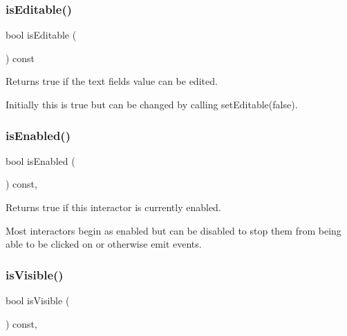 \subsubsection{\texorpdfstring{is\+Editable()}{isEditable()}}
{\footnotesize\ttfamily bool is\+Editable (\begin{DoxyParamCaption}{ }\end{DoxyParamCaption}) const\hspace{0.3cm}{\ttfamily [virtual]}}



Returns true if the text field\textquotesingle{}s value can be edited. 

Initially this is true but can be changed by calling set\+Editable(false). \mbox{\label{classGInteractor_aacb819fb241851fd9fc045271baa4034}} 
\subsubsection{\texorpdfstring{is\+Enabled()}{isEnabled()}}
{\footnotesize\ttfamily bool is\+Enabled (\begin{DoxyParamCaption}{ }\end{DoxyParamCaption}) const\hspace{0.3cm}{\ttfamily [virtual]}, {\ttfamily [inherited]}}



Returns true if this interactor is currently enabled. 

Most interactors begin as enabled but can be disabled to stop them from being able to be clicked on or otherwise emit events. \mbox{\label{classGInteractor_a9d8a6cfb13917785c143e74d40e4e2be}} 
\subsubsection{\texorpdfstring{is\+Visible()}{isVisible()}}
{\footnotesize\ttfamily bool is\+Visible (\begin{DoxyParamCaption}{ }\end{DoxyParamCaption}) const\hspace{0.3cm}{\ttfamily [virtual]}, {\ttfamily [inherited]}}



